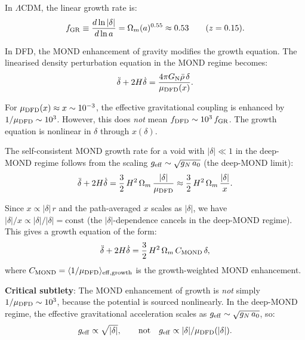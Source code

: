 \documentclass[11pt,a4paper]{article}
\newcommand{\LCDM}{$\Lambda$CDM}
\newcommand{\aM}{a_0}
\newcommand{\mufd}{\mu_{\rm DFD}}
\newcommand{\GN}{G_{\rm N}}
\newcommand{\Omm}{\Omega_m}
\begin{document}
\begin{tcolorbox}[colback=red!5!white, colframe=red!60!black,
  title=\textbf{Key Correction: MOND-Enhanced Void Growth}]

In \LCDM, the linear growth rate is:
\begin{equation}
f_{\rm GR} \equiv \frac{d\ln|\delta|}{d\ln a}
= \Omm(a)^{0.55} \approx 0.53
\qquad (z = 0.15).
\label{eq:f-GR}
\end{equation}

In DFD, the MOND enhancement of gravity modifies the growth equation.
The linearised density perturbation equation in the MOND regime becomes:
\begin{equation}
\ddot{\delta} + 2H\dot{\delta}
= \frac{4\pi\GN\bar{\rho}\,\delta}{\mufd(x)}.
\label{eq:growth-MOND}
\end{equation}

For $\mufd(x) \approx x \sim 10^{-3}$, the effective gravitational
coupling is enhanced by $1/\mufd \sim 10^3$. However, this does
\emph{not} mean $f_{\rm DFD} \sim 10^3\,f_{\rm GR}$. The growth
equation is nonlinear in $\delta$ through $x(\delta)$.

The self-consistent MOND growth rate for a void with $|\delta| \ll 1$
in the deep-MOND regime follows from the scaling
$g_{\rm eff} \sim \sqrt{g_N\,\aM}$ (the deep-MOND limit):
\begin{equation}
\ddot{\delta} + 2H\dot{\delta}
= \frac{3}{2}\,H^2\,\Omm\,\frac{|\delta|}{\mufd}
\approx \frac{3}{2}\,H^2\,\Omm\,\frac{|\delta|}{x}.
\label{eq:growth-deep}
\end{equation}

Since $x \propto |\delta|\,r$ and the path-averaged $x$ scales as
$|\delta|$, we have $|\delta|/x \propto |\delta|/|\delta| = \text{const}$
(the $|\delta|$-dependence cancels in the deep-MOND regime). This gives
a growth equation of the form:
\begin{equation}
\ddot{\delta} + 2H\dot{\delta}
= \frac{3}{2}\,H^2\,\Omm\,C_{\rm MOND}\,\delta,
\label{eq:growth-eff}
\end{equation}
where $C_{\rm MOND} = \langle 1/\mufd \rangle_{\rm eff, growth}$ is
the growth-weighted MOND enhancement.

\textbf{Critical subtlety}: The MOND enhancement of growth is
\emph{not} simply $1/\mufd \sim 10^3$, because the potential is
sourced nonlinearly. In the deep-MOND regime, the effective
gravitational acceleration scales as $g_{\rm eff} \sim \sqrt{g_N\,\aM}$,
so:
\begin{equation}
g_{\rm eff} \propto \sqrt{|\delta|}, \qquad
\text{not} \quad g_{\rm eff} \propto |\delta|/\mufd(|\delta|).
\end{equation}


\end{tcolorbox}
\end{document}
